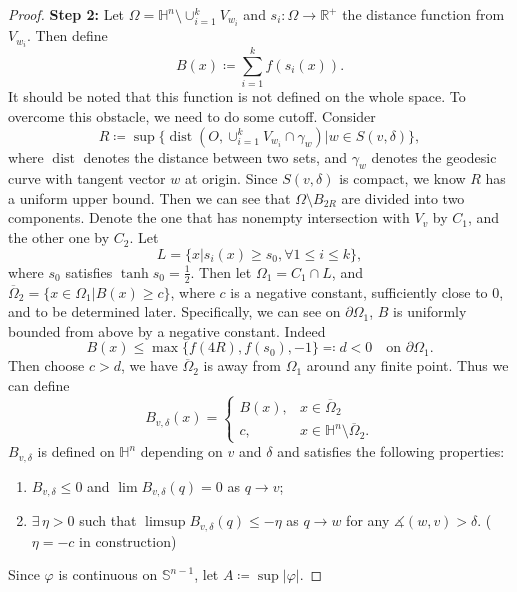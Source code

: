 \documentclass[reqno]{amsart}
\theoremstyle{remark}
\theoremstyle{definition}
\numberwithin{equation}{section}
\begin{document}
\begin{proof}
\textbf{Step 2:} Let $\Omega = \mathbb{H}^n \setminus \cup_{i=1}^k V_{w_i}$ and $s_i: \Omega \to \mathbb{R}^{+}$ the distance function from $V_{w_i}$. Then define 
\[
B(x) \coloneqq 
\sum_{i=1}^{k} f(s_i(x)).
\]
It should be noted that this function is not defined on the whole space. To overcome this obstacle, we need to do some cutoff. Consider
\[
R \coloneqq \sup \{\operatorname{dist}(O, \cup_{i=1}^k V_{w_i} \cap \gamma_{w}) | w \in S(v, \delta) \},
\]
where $\operatorname{dist}$ denotes the distance between two sets, and $\gamma_{w}$ denotes the geodesic curve with tangent vector $w$ at origin. Since $S(v, \delta)$ is compact, we know $R$ has a uniform upper bound. Then we can see that $\Omega \setminus B_{2R}$ are divided into two components. Denote the one that has nonempty intersection with $V_{v}$ by $C_1$, and the other one by $C_2$. Let
\[
L = \{ x| s_i(x) \geqslant s_0,  \forall 1 \leqslant i \leqslant k \},
\]
where $s_0$ satisfies $\tanh s_0 = \frac{1}{2}$.
Then let $\Omega_1 = C_1 \cap L$, and $\overline{\Omega}_2 = \{x \in \Omega_1 | B(x) \geqslant c\}$, where $c$ is a negative constant, sufficiently close to $0$, and to be determined later. Specifically, we can see on $\partial \Omega_1$, $B$ is uniformly bounded from above by a negative constant. Indeed
\[
B(x) \leqslant \max\{f(4R), f(s_0), -1\} \eqqcolon d < 0  \quad \text{on } \partial \Omega_1.
\]
Then choose $c > d$, we have $\overline{\Omega}_2$ is away from $\Omega_1$ around any finite point.
Thus we can define
\[
B_{v, \delta}(x) =
\begin{cases}
    B(x), &x \in \overline{\Omega}_2 \\
    c, &x \in \mathbb{H}^n \setminus \overline{\Omega}_2.
\end{cases}
\]
$B_{v, \delta}$ is defined on $\mathbb{H}^n$ depending on $v$ and $\delta$ and satisfies the following properties:
\begin{enumerate}[label=\text{(\arabic*)}]
    \item $B_{v,\delta} \leqslant 0$ and $\lim B_{v,\delta}(q) = 0$ as $q \to v$;
    \item $\exists \, \eta > 0$ such that $\limsup B_{v,\delta}(q) \leqslant - \eta$ as $q \to w$ for any $\measuredangle (w, v) > \delta$. ($\eta = -c$ in construction)
\end{enumerate}
Since $\varphi$ is continuous on $\mathbb{S}^{n-1}$, let $A \coloneqq \sup |\varphi|$. 


\end{proof}
\end{document}
